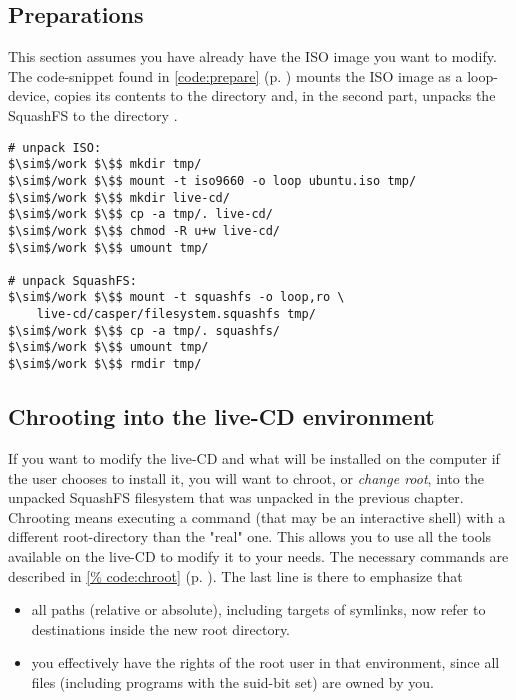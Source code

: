 \subsection{Preparations}
This section assumes you have already have the ISO image you want to modify. The
code-snippet found in \lstlistingname{} \ref{code:prepare} (p. \pageref{code:prepare})
mounts the ISO image  as a loop-device, copies its
contents to the directory  and, in the second part, unpacks
the SquashFS to the directory . 
\begin{lstlisting}[caption={Unpacking the ISO and SquashFS filesystems},float=ht,label=code:prepare]
# unpack ISO:
$\sim$/work $\$$ mkdir tmp/
$\sim$/work $\$$ mount -t iso9660 -o loop ubuntu.iso tmp/
$\sim$/work $\$$ mkdir live-cd/
$\sim$/work $\$$ cp -a tmp/. live-cd/
$\sim$/work $\$$ chmod -R u+w live-cd/
$\sim$/work $\$$ umount tmp/

# unpack SquashFS:
$\sim$/work $\$$ mount -t squashfs -o loop,ro \
	live-cd/casper/filesystem.squashfs tmp/
$\sim$/work $\$$ cp -a tmp/. squashfs/
$\sim$/work $\$$ umount tmp/
$\sim$/work $\$$ rmdir tmp/
\end{lstlisting}

\subsection{Chrooting into the live-CD environment}
If you want to modify the live-CD and what will be installed on the
computer if the user chooses to install it, you will want to chroot, or
\emph{change root}, into the unpacked SquashFS filesystem that was unpacked in
the previous chapter. Chrooting means executing a command (that may be an
interactive shell) with a different root-directory than the "real" one. This
allows you to use all the tools available on the live-CD to modify it to your
needs. The necessary commands are described in \lstlistingname{} \ref{%
code:chroot} (p. \pageref{code:chroot}). The last line is there to emphasize
that 
\begin{itemize}
\item all paths (relative or absolute), including targets of symlinks, now refer
to destinations inside the new root directory.
\item you effectively have the rights of the root user in that environment,
since all files (including programs with the suid-bit set) are owned by you.
\end{itemize}

